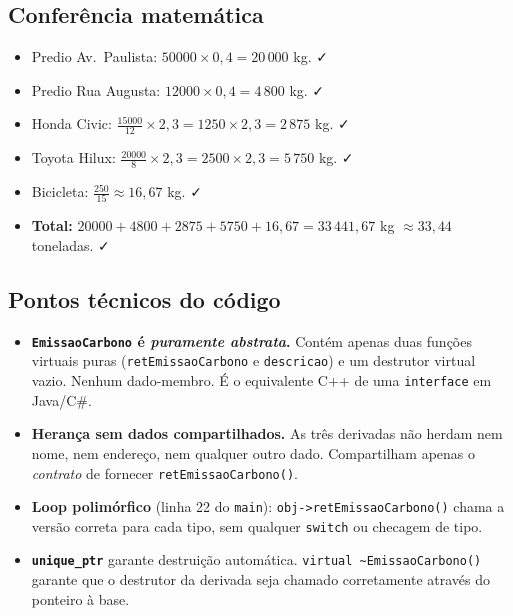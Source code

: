 \documentclass[11pt,a4paper]{article}
\begin{document}
\subsection*{Confer\^encia matem\'atica}

\begin{itemize}[leftmargin=*,itemsep=0pt]
  \item Predio Av.\ Paulista: $50000 \times 0{,}4 = 20\,000$ kg. ✓
  \item Predio Rua Augusta: $12000 \times 0{,}4 = 4\,800$ kg. ✓
  \item Honda Civic: $\frac{15000}{12} \times 2{,}3 = 1250 \times 2{,}3 = 2\,875$ kg. ✓
  \item Toyota Hilux: $\frac{20000}{8} \times 2{,}3 = 2500 \times 2{,}3 = 5\,750$ kg. ✓
  \item Bicicleta: $\frac{250}{15} \approx 16{,}67$ kg. ✓
  \item \textbf{Total:} $20000 + 4800 + 2875 + 5750 + 16{,}67 = 33\,441{,}67$ kg $\approx 33{,}44$ toneladas. ✓
\end{itemize}

\subsection*{Pontos t\'ecnicos do c\'odigo}

\begin{itemize}[leftmargin=*]
  \item \textbf{\texttt{EmissaoCarbono} \'e \emph{puramente abstrata}.} Cont\'em apenas duas fun\c{c}\~oes virtuais puras (\texttt{retEmissaoCarbono} e \texttt{descricao}) e um destrutor virtual vazio. Nenhum dado-membro. \'E o equivalente C++ de uma \texttt{interface} em Java/C\#.
  \item \textbf{Heran\c{c}a sem dados compartilhados.} As tr\^es derivadas n\~ao herdam nem nome, nem endere\c{c}o, nem qualquer outro dado. Compartilham apenas o \emph{contrato} de fornecer \texttt{retEmissaoCarbono()}.
  \item \textbf{Loop polim\'orfico} (linha 22 do \texttt{main}): \texttt{obj->retEmissaoCarbono()} chama a vers\~ao correta para cada tipo, sem qualquer \texttt{switch} ou checagem de tipo.
  \item \textbf{\texttt{unique\_ptr}} garante destrui\c{c}\~ao autom\'atica. \texttt{virtual \~{}EmissaoCarbono()} garante que o destrutor da derivada seja chamado corretamente atrav\'es do ponteiro \`a base.
\end{itemize}
\end{document}
